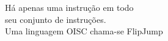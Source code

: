 \documentclass[preview]{standalone}
\begin{document}
Há apenas uma instrução em todo\\ seu conjunto de instruções.\\Uma linguagem OISC chama-se FlipJump\\
\end{document}
